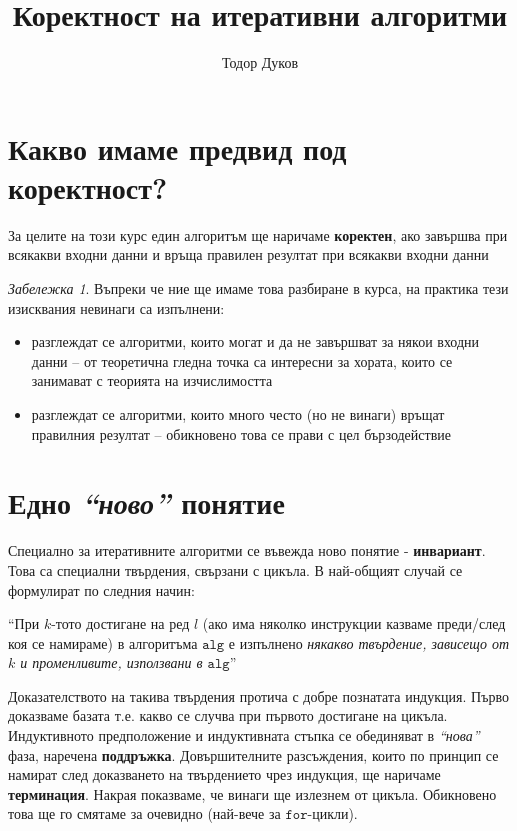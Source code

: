 \documentclass{article}
\title{Коректност на итеративни алгоритми}
\author{Тодор Дуков}
\date{}
\theoremstyle{definition}
\theoremstyle{plain}
\theoremstyle{remark}
\newtheorem*{remark}{Забележка}
\theoremstyle{definition}
\begin{document}
\maketitle

\section*{Какво имаме предвид под коректност?}

За целите на този курс един алгоритъм ще наричаме \textbf{коректен}, ако завършва при всякакви входни данни и връща правилен резултат при всякакви входни данни

\begin{remark}
    Въпреки че ние ще имаме това разбиране в курса, на практика тези изисквания невинаги са изпълнени:
    \begin{itemize}
        \item разглеждат се алгоритми, които могат и да не завършват за някои входни данни -- от теоретична гледна точка са интересни за хората, които се занимават с теорията на изчислимостта
        \item разглеждат се алгоритми, които много често (но не винаги) връщат правилния резултат -- обикновено това се прави с цел бързодействие
    \end{itemize}
\end{remark}

\section*{Едно \textit{``ново''} понятие}

Специално за итеративните алгоритми се въвежда ново понятие - \textbf{инвариант}.
Това са специални твърдения, свързани с цикъла.
В най-общият случай се формулират по следния начин:
\begin{center}
    ``При $k$-тото достигане на ред $l$ (ако има няколко инструкции казваме преди/след коя се намираме) в алгоритъма $\mathtt{alg}$ е изпълнено \textit{някакво твърдение, зависещо от $k$ и променливите, използвани в $\mathtt{alg}$}''
\end{center}
Доказателството на такива твърдения протича с добре познатата индукция.
Първо доказваме базата т.е. какво се случва при първото достигане на цикъла.
Индуктивното предположение и индуктивната стъпка се обединяват в \textit{``нова''} фаза, наречена \textbf{поддръжка}.
Довършителните разсъждения, които по принцип се намират след доказването на твърдението чрез индукция, ще наричаме \textbf{терминация}.
Накрая показваме, че винаги ще излезнем от цикъла.
Обикновено това ще го смятаме за очевидно (най-вече за $\mathtt{for}$-цикли).
\end{document}
